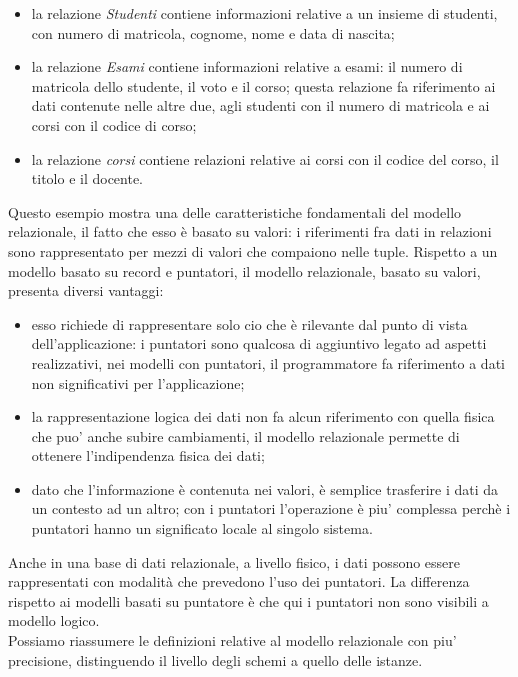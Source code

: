 \documentclass[12pt]{report}
\begin{document}
	\begin{itemize}
		\item la relazione \textit{Studenti} contiene informazioni relative a un insieme di studenti, con numero di matricola, cognome, nome e data di nascita;
		\item la relazione \textit{Esami} contiene informazioni relative a esami: il numero di matricola dello studente, il voto e il corso; questa relazione fa riferimento ai dati contenute nelle altre due, agli studenti con il numero di matricola e ai corsi con il codice di corso;
		\item la relazione \textit{corsi} contiene relazioni relative ai corsi con il codice del corso, il titolo e il docente.
	\end{itemize}
	Questo esempio mostra una delle caratteristiche fondamentali del modello relazionale, il fatto che esso è basato su valori: i riferimenti fra dati in relazioni sono rappresentato per mezzi di valori che compaiono nelle tuple. Rispetto a un modello basato su record e puntatori, il modello relazionale, basato su valori, presenta diversi vantaggi:
	\begin{itemize}
		\item esso richiede di rappresentare solo cio che è rilevante dal punto di vista dell'applicazione: i puntatori sono qualcosa di aggiuntivo legato ad aspetti realizzativi, nei modelli con puntatori, il programmatore fa riferimento a dati non significativi per l'applicazione;
		\item la rappresentazione logica dei dati non fa alcun riferimento con quella fisica che puo' anche subire cambiamenti, il modello relazionale permette di ottenere l'indipendenza fisica dei dati;
		\item dato che l'informazione è contenuta nei valori, è semplice trasferire i dati da un contesto ad un altro; con i puntatori l'operazione è piu' complessa perchè i puntatori hanno un significato locale al singolo sistema.
	\end{itemize}
	Anche in una base di dati relazionale, a livello fisico, i dati possono essere rappresentati con modalità che prevedono l'uso dei puntatori. La differenza rispetto ai modelli basati su puntatore è che qui i puntatori non sono visibili a modello logico. \\
	Possiamo riassumere le definizioni relative al modello relazionale con piu' precisione, distinguendo il livello degli schemi a quello delle istanze.
\end{document}
